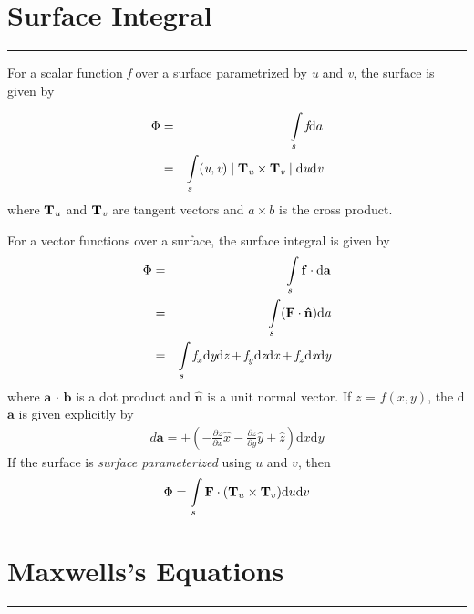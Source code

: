 \documentclass[letterpaper,10pt,titlepage,fleqn]{article}
\begin{document}

\section*{Surface Integral}
\addtocounter{section}{1}

\hrule

For a scalar function \textit{f} over a surface parametrized by \textit{u} and \textit{v}, the surface is given by


\begin{eqnarray}
  \Phi &=& \int\limits_s \textit{f} \text{d}a\\
   &=& \int\limits_s(\textit{u},\textit{v}) \mid \bold{T_\textit{u}}\times\bold{T_\textit{v}}\mid \text{d} \textit{u} \text{d} \textit{v}
\end{eqnarray}
where $\bold{T_\textit{u}}$ and $\bold{T_\textit{v}}$ are tangent vectors and $a \times b$ is the cross product.

For a vector functions over a surface, the surface integral is given by 
\begin{eqnarray}
 \Phi &=& \int\limits_s \bold{f} \cdot \text{d} \bold{a}\\
 &=& \int\limits_s (\mathbf{F} \cdot \bold{\hat{n}}) \text{d} \textit{a}\\
 &=& \int\limits_s \textit{f}_{x} \text{d} \textit{y} \text{d} \textit{z} + \textit{f}_{y} \text{d} \textit{z} \text{d} \textit{x}+\textit{f}_{z} \text{d} \textit{x}\text{d} \textit{y}
\end{eqnarray}
where $\mathbf{a}$ $\cdot$ $\mathbf{b}$ is a dot product and $\mathbf{\hat{n}}$ is a unit normal vector. If $z$ = $f(x,y)$, the d$\mathbf{a}$ is given explicitly by
\begin{eqnarray}
d\mathbf{a} = \pm(- \frac{\partial z}{\partial x}\hat{x}-\frac{\partial z}{\partial y}\hat{y}+\hat{z} )\text{d}x\text{d}y
\end{eqnarray}
If the surface is \textit{surface parameterized} using $u$ and $v$, then
\begin{eqnarray}
\Phi=\int\limits_s \bold{F} \cdot (\mathbf{T}_{u}\times \mathbf{T}_{v})\text{d}u\text{d}v
\end{eqnarray}
\section*{Maxwells's Equations}
\addtocounter{section}{1}
\addtocounter{equation}{-7}
\hrule
\end{document}
